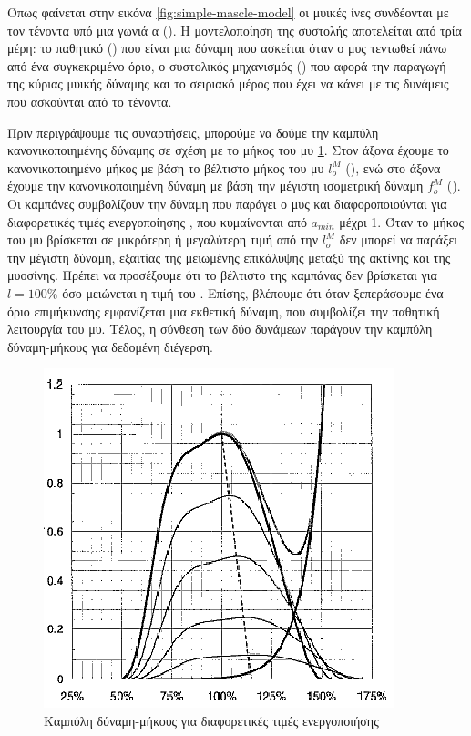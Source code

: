 Όπως φαίνεται στην εικόνα \ref{fig:simple-mascle-model} οι μυικές ίνες συνδέονται με τον τένοντα υπό μια γωνιά α (). Η μοντελοποίηση της συστολής αποτελείται από τρία μέρη: το παθητικό () που είναι μια δύναμη που ασκείται όταν ο μυς τεντωθεί πάνω από ένα συγκεκριμένο όριο, ο συστολικός μηχανισμός () που αφορά την παραγωγή της κύριας μυικής δύναμης και το σειριακό μέρος που έχει να κάνει με τις δυνάμεις που ασκούνται από το τένοντα.

Πριν περιγράψουμε τις συναρτήσεις, μπορούμε να δούμε την καμπύλη κανονικοποιημένης δύναμης σε σχέση με το μήκος του μυ \ref{fig:active-force-legnth}. Στον άξονα  έχουμε το κανονικοποιημένο μήκος με βάση το βέλτιστο μήκος του μυ $l^{M}_{o}$ (), ενώ στο άξονα  έχουμε την κανονικοποιημένη δύναμη με βάση την μέγιστη ισομετρική δύναμη $f^{M}_{o}$ (). Οι καμπάνες συμβολίζουν την δύναμη που παράγει ο μυς και διαφοροποιούνται για διαφορετικές τιμές ενεργοποίησης , που κυμαίνονται από $a_{min}$ μέχρι 1. Όταν το μήκος του μυ βρίσκεται σε μικρότερη ή μεγαλύτερη τιμή από την $l^{M}_{o}$ δεν μπορεί να παράξει την μέγιστη δύναμη, εξαιτίας της μειωμένης επικάλυψης μεταξύ της ακτίνης και της μυοσίνης. Πρέπει να προσέξουμε ότι το βέλτιστο της καμπάνας δεν βρίσκεται για $l = 100\%$ όσο μειώνεται η τιμή του . Επίσης, βλέπουμε ότι όταν ξεπεράσουμε ένα όριο επιμήκυνσης εμφανίζεται μια εκθετική δύναμη, που συμβολίζει την παθητική λειτουργία του μυ. Τέλος, η σύνθεση των δύο δυνάμεων παράγουν την καμπύλη δύναμη-μήκους για δεδομένη διέγερση.

\begin{figure}[H]
    \centering
    \includegraphics[width=.5\textwidth, height=.35\textheight]{musculoskeletal/fig/active-force-legnth.png}
    \caption{Καμπύλη δύναμη-μήκους για διαφορετικές τιμές ενεργοποιήσης\cite{buchanan04}}
    \label{fig:active-force-legnth}
\end{figure}

